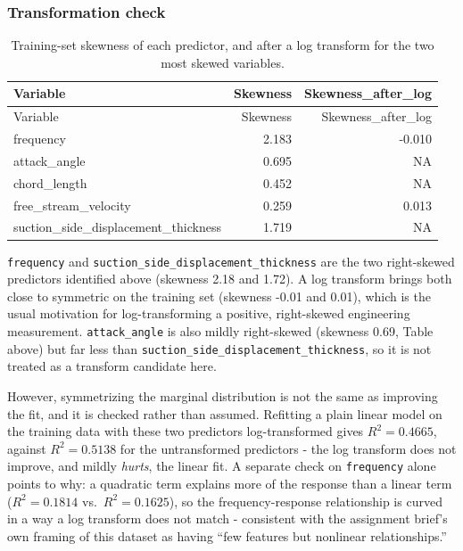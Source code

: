 \documentclass[
  11pt,
]{article}
\begin{document}
\subsubsection{Transformation check}\label{transformation-check}

\begin{longtable}[]{@{}lrr@{}}
\caption{Training-set skewness of each predictor, and after a log
transform for the two most skewed variables.}\tabularnewline
\toprule\noalign{}
Variable & Skewness & Skewness\_after\_log \\
\midrule\noalign{}
\endfirsthead
\toprule\noalign{}
Variable & Skewness & Skewness\_after\_log \\
\midrule\noalign{}
\endhead
\bottomrule\noalign{}
\endlastfoot
frequency & 2.183 & -0.010 \\
attack\_angle & 0.695 & NA \\
chord\_length & 0.452 & NA \\
free\_stream\_velocity & 0.259 & 0.013 \\
suction\_side\_displacement\_thickness & 1.719 & NA \\
\end{longtable}

\texttt{frequency} and \texttt{suction\_side\_displacement\_thickness}
are the two right-skewed predictors identified above (skewness 2.18 and
1.72). A log transform brings both close to symmetric on the training
set (skewness -0.01 and 0.01), which is the usual motivation for
log-transforming a positive, right-skewed engineering measurement.
\texttt{attack\_angle} is also mildly right-skewed (skewness 0.69, Table
above) but far less than
\texttt{suction\_side\_displacement\_thickness}, so it is not treated as
a transform candidate here.

However, symmetrizing the marginal distribution is not the same as
improving the fit, and it is checked rather than assumed. Refitting a
plain linear model on the training data with these two predictors
log-transformed gives \(R^2 = 0.4665\), against \(R^2 = 0.5138\) for the
untransformed predictors - the log transform does not improve, and
mildly \emph{hurts}, the linear fit. A separate check on
\texttt{frequency} alone points to why: a quadratic term explains more
of the response than a linear term (\(R^2 = 0.1814\)
vs.~\(R^2 = 0.1625\)), so the frequency-response relationship is curved
in a way a log transform does not match - consistent with the assignment
brief's own framing of this dataset as having ``few features but
nonlinear relationships.''
\end{document}
